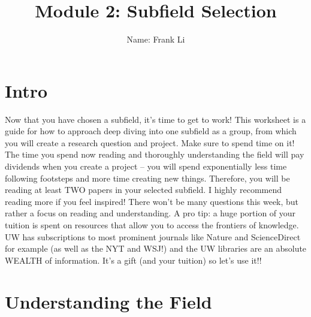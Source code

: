 \documentclass[letterpaper,11pt]{article}
\begin{document}
\title{{\bf Module 2: Subfield Selection} }
\author{Name: Frank Li}

\date{}
\maketitle

\section{Intro}
Now that you have chosen a subfield, it's time to get to work! This worksheet is a guide for how to approach deep diving into one subfield as a group, from which you will create a research question and project. Make sure to spend time on it! The time you spend now reading and thoroughly understanding the field will pay dividends when you create a project -- you will spend exponentially less time following footsteps and more time creating new things. Therefore, you will be reading at least TWO papers in your selected subfield. I highly recommend reading more if you feel inspired!
\newline
\newline
There won't be many questions this week, but rather a focus on reading and understanding. A pro tip: a huge portion of your tuition is spent on resources that allow you to access the frontiers of knowledge. UW has subscriptions to most prominent journals like Nature and ScienceDirect for example (as well as the NYT and WSJ!) and the UW libraries are an absolute WEALTH of information. It's a gift (and your tuition) so let's use it!!
\section{Understanding the Field}
\end{document}

